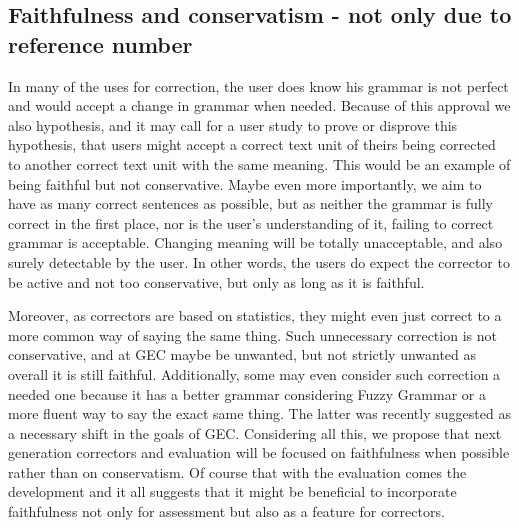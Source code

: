\documentclass[letter,11pt]{article}
\begin{document}
	\subsection{Faithfulness and conservatism - not only due to reference number}
	In many of the uses for correction,
		the user does know his grammar is not perfect and would accept
		a change in grammar when needed. Because of this approval we also
		hypothesis, and it may call for a user study to prove or disprove
		this hypothesis, that users might accept a correct text unit of theirs
		being corrected to another correct text unit with the same meaning.
		This would be an example of being faithful but not conservative.
		Maybe even more importantly, we aim to have as many correct sentences
		as possible, but as neither the grammar is fully correct in the first place,
		nor is the user's understanding of it, failing to correct grammar
		is acceptable. Changing meaning will be totally unacceptable, and
		also surely detectable by the user. In other words, the users do expect
		the corrector to be active and not too conservative, but
		only as long as it is faithful. 
		
		Moreover, as correctors are based on statistics, they might even
		just correct to a more common way of saying the same thing. Such unnecessary
		correction is not conservative, and at GEC maybe be unwanted, but not strictly unwanted as overall
		it is still faithful. Additionally, some may even
		consider such correction a needed one because it has a better grammar considering
		Fuzzy Grammar\cite{lakoff1973fuzzy,madnani2011they} or a more fluent
		way to say the exact same thing. The latter was recently suggested as a necessary
		shift in the goals of GEC\cite{sakaguchi2016reassessing}.
		Considering all this, we propose that next generation correctors and evaluation will be focused on faithfulness
		when possible rather than on conservatism. Of course that with the evaluation comes the development and it all suggests that it might be beneficial to incorporate faithfulness not only for assessment but also as a feature for correctors. 




\appendix
\end{document}
